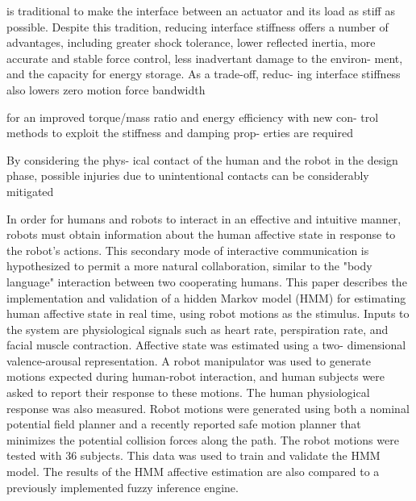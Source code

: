   
  
is 
traditional to 
make 
the 
interface 
between 
an 
actuator 
and its load 
as 
stiff 
as possible. Despite this tradition, reducing 
interface  stiffness  offers 
a  number 
of 
advantages,  including 
greater shock  tolerance,  lower  reflected 
inertia, 
more 
accurate 
and 
stable 
force control, less inadvertant damage to 
the environ- 
ment, and 
the 
capacity 
for 
energy 
storage. 
As 
a trade-off, reduc- 
ing 
interface    stiffness   also    lowers    zero    motion 
force 
bandwidth






for an improved
torque/mass ratio and energy efficiency with new con-
trol methods to exploit the stiffness and damping prop-
erties are required



By considering the phys-
ical contact of the human and the robot in the design
phase, possible injuries due to unintentional contacts
can be considerably mitigated

In order for humans and robots to interact in an effective and intuitive manner, robots must obtain information about the human affective state in response to the robot's actions. This secondary mode of interactive communication is hypothesized to permit a more natural collaboration, similar to the "body language" interaction between two cooperating humans. This paper describes the implementation and validation of a hidden Markov model (HMM) for estimating human affective state in real time, using robot motions as the stimulus. Inputs to the system are physiological signals such as heart rate, perspiration rate, and facial muscle contraction. Affective state was estimated using a two- dimensional valence-arousal representation. A robot manipulator was used to generate motions expected during human-robot interaction, and human subjects were asked to report their response to these motions. The human physiological response was also measured. Robot motions were generated using both a nominal potential field planner and a recently reported safe motion planner that minimizes the potential collision forces along the path. The robot motions were tested with 36 subjects. This data was used to train and validate the HMM model. The results of the HMM affective estimation are also compared to a previously implemented fuzzy inference engine.


